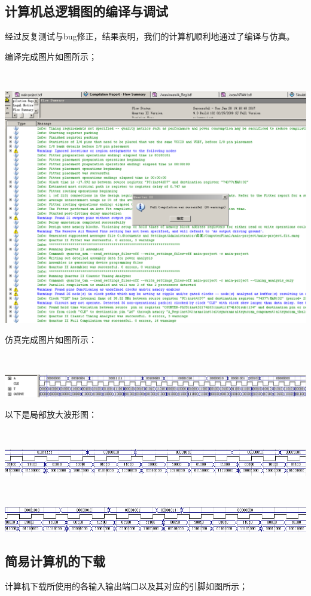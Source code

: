 \documentclass[UTF8]{ctexart}
\begin{document}
    \subsection{计算机总逻辑图的编译与调试}
    经过反复测试与bug修正，结果表明，我们的计算机顺利地通过了编译与仿真。

    编译完成图片如图所示；

    ~

    \includegraphics[width=1.0\textwidth]{./img/编译通过.png}

    仿真完成图片如图所示：

    ~

    \includegraphics[width=1.0\textwidth]{./img/波形图1.png}

    以下是局部放大波形图：

    ~

    \includegraphics[width=1.0\textwidth]{./img/波形图2.png}

    ~

    \includegraphics[width=1.0\textwidth]{./img/波形图3.png}


    \subsection{简易计算机的下载}
    计算机下载所使用的各输入输出端口以及其对应的引脚如图所示；
\end{document}
